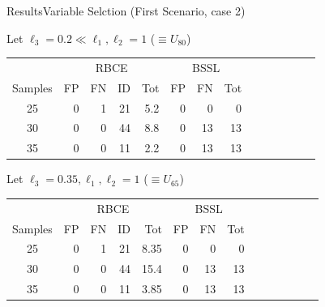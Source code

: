 \documentclass[aspectratio=169]{beamer}					%
\begin{document}
\begin{frame}{Results}{Variable Selction (First Scenario, case 2)}

Let \alert{$\ell_3 = 0.2 \ll \ell_1,\ell_2 = 1$ ($\equiv U_{80}$)}

\begin{table}[h]
    \centering
    \begin{tabular}{|c||rrr|r||rr|r||rr|r||rr|r|}
  \hline
  &\multicolumn{4}{c||}{RBCE}&\multicolumn{3}{c|}{BSSL}\\
  \cline{2-14}
 Samples & FP & FN & ID & Tot & FP & FN & Tot \\ 
  \hline
25 &   0 &   1 &  21 & 5.2 &   0 &   0 &   0\\ 
  30 &   0 &   0 &  44 & 8.8 &  0 &  13 &   13\\ 
  35 &   0 &   0 &  11 & 2.2 &  0 &  13 &   13\\ 
  \hline
\end{tabular}
\end{table}
\pause
Let \alert{$\ell_3 = 0.35, \ell_1,\ell_2 = 1$ ($\equiv U_{65}$)}

\begin{table}[h]
    \centering
    \begin{tabular}{|c||rrr|r||rr|r||rr|r||rr|r|}
  \hline
  &\multicolumn{4}{c||}{RBCE}&\multicolumn{3}{c|}{BSSL}\\
  \cline{2-14}
 Samples & FP & FN & ID & Tot & FP & FN & Tot \\ 
  \hline
25 &   0 &   1 &  21 & 8.35 &   0 &   0 &   0\\ 
  30 &   0 &   0 &  44 & 15.4 &  0 &  13 &   13\\ 
  35 &   0 &   0 &  11 & 3.85 &  0 &  13 &   13\\ 
  \hline
\end{tabular}
\end{table}

\end{frame}

\iffalse
\end{document}
